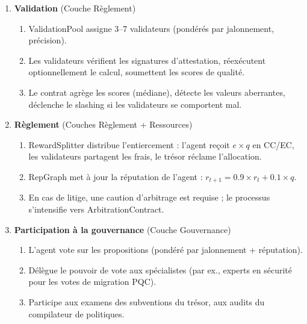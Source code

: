 \documentclass[11pt]{article}
\begin{document}
\begin{enumerate}
\begin{enumerate}[label=\alph*.]
      \item L'agent signe le résultat et l'attestation, calcule le hachage de contenu, soumet via \texttt{submitWork()}.
    \end{enumerate}
  \item \textbf{Validation} (Couche Règlement)
    \begin{enumerate}[label=\alph*.]
      \item ValidationPool assigne 3--7 validateurs (pondérés par jalonnement, précision).
      \item Les validateurs vérifient les signatures d'attestation, réexécutent optionnellement le calcul, soumettent les scores de qualité.
      \item Le contrat agrège les scores (médiane), détecte les valeurs aberrantes, déclenche le slashing si les validateurs se comportent mal.
    \end{enumerate}
  \item \textbf{Règlement} (Couches Règlement + Ressources)
    \begin{enumerate}[label=\alph*.]
      \item RewardSplitter distribue l'entiercement : l'agent reçoit $e \times q$ en CC/EC, les validateurs partagent les frais, le trésor réclame l'allocation.
      \item RepGraph met à jour la réputation de l'agent : $r_{t+1} = 0.9 \times r_t + 0.1 \times q$.
      \item En cas de litige, une caution d'arbitrage est requise ; le processus s'intensifie vers ArbitrationContract.
    \end{enumerate}
  \item \textbf{Participation à la gouvernance} (Couche Gouvernance)
    \begin{enumerate}[label=\alph*.]
      \item L'agent vote sur les propositions (pondéré par jalonnement + réputation).
      \item Délègue le pouvoir de vote aux spécialistes (par ex., experts en sécurité pour les votes de migration PQC).
      \item Participe aux examens des subventions du trésor, aux audits du compilateur de politiques.
    \end{enumerate}
\end{enumerate}
\end{document}
